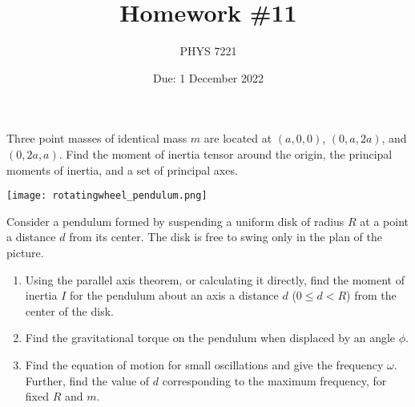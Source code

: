 \documentclass{jhwhw}
\author{PHYS 7221}
\title{Homework \#11}
\date{Due: 1 December 2022}
\begin{document}

Three point masses of identical mass $m$ are located at $(a,0,0)$, $(0,a,2a)$, and $(0,2a,a)$.
Find the moment of inertia tensor around the origin, the principal moments of inertia, and a set of principal axes.


\begin{center}
  \texttt{[image: rotatingwheel\_pendulum.png]}
\end{center}

Consider a pendulum formed by suspending a uniform disk of radius $R$ at a point a distance $d$ from its center.
The disk is free to swing only in the plan of the picture.
\begin{enumerate}
  \item Using the parallel axis theorem, or calculating it directly, find the moment of inertia $I$ for the pendulum about an axis a distance $d$ ($0 \leq d < R$) from the center of the disk.
  \item Find the gravitational torque on the pendulum when displaced by an angle $\phi$.
  \item Find the equation of motion for small oscillations and give the frequency $\omega$. Further, find the value of $d$ corresponding to the maximum frequency, for fixed $R$ and $m$.
\end{enumerate}

\end{document}
